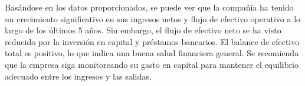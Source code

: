 

Basándose en los datos proporcionados, se puede ver que la compañía ha tenido un crecimiento significativo en sus ingresos netos y flujo de efectivo operativo a lo largo de los últimos 5 años. Sin embargo, el flujo de efectivo neto se ha visto reducido por la inversión en capital y préstamos bancarios. El balance de efectivo total es positivo, lo que indica una buena salud financiera general. Se recomienda que la empresa siga monitoreando su gasto en capital para mantener el equilibrio adecuado entre los ingresos y las salidas.